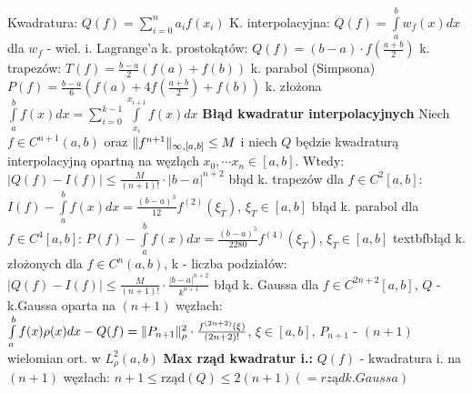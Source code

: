 
\entry
Kwadratura:
	\(
		Q(f) = \sum\limits_{i=0}^n a_if(x_i)
    \)
\entry
K. interpolacyjna:
    \(
        Q(f) = \int\limits_a^bw_f(x)dx
	\) dla $w_f$ - wiel. i. Lagrange'a
\entry
k. prostokątów:
	\(
		Q(f) = (b-a)\cdot f(\frac{a+b}{2})
	\)
\entry
k. trapezów:
	\(
		T(f) = \frac{b-a}{2}(f(a)+f(b))
	\)
\entry
k. parabol (Simpsona)
	\(
		P(f) = \frac{b-a}{6}(f(a) + 4f(\frac{a+b}{2})+f(b))
	\)
\entry
k. złożona
    \(
        \int\limits_a^b f(x)dx = \sum_{i=0}^{k-1} \int\limits_{x_i}^{x_{i+1}} f(x)dx
    \)
\entry
\textbf{Błąd kwadratur interpolacyjnych}
	Niech $f \in C^{n+1}(a, b)$ oraz $\|f^{n+1}\|_{\infty, [a, b]} \leq M$ i niech $Q$ będzie kwadraturą interpolacyjną opartną na węzłąch $x_0, \cdots x_n \in [a, b]$. Wtedy:
	\(
		|Q(f) - I(f)| \leq \frac{M}{(n+1)!} \cdot |b-a|^{n+2}
	\)
\entry
błąd k. trapezów dla $f \in C^2[a, b]$:
	\(
		I(f) - \int\limits_a^bf(x)dx = \frac{(b-a)^3}{12}f^{(2)}(\xi_T)
	\), $\xi_T \in [a, b]$
\entry
błąd k. parabol dla $f \in C^4[a, b]$:
	\(
		P(f) - \int\limits_a^bf(x)dx = \frac{(b-a)^5}{2280}f^{(4)}(\xi_T)
	\), $\xi_T \in [a, b]$
\entry
textbf{błąd k. złożonych} dla $f \in C^{n}(a, b)$, k - liczba podziałów:
    \(
        |Q(f) - I(f)| \leq \frac{M}{(n+1)!} \cdot \frac{|b-a|^{n+2}}{k^{n+1}}
    \)
\entry
błąd k. Gaussa dla $f \in  C^{2n+2}[a, b]$, $Q$ - k.Gaussa oparta na $(n+1)$ węzłach:
	\(
		\int\limits_a^b f(x)\rho(x)dx - Q(f) = \|P_{n+1}\|^2_\rho\cdot \frac{f^{(2n+2)}(\xi)}{(2n+2)!}
	\), $\xi \in [a, b]$, $P_{n+1}$ - $(n+1)$ wielomian ort. w $L^2_\rho(a, b)$
\entry
\textbf{Max rząd kwadratur i.:} $Q(f)$ - kwadratura i. na $(n+1)$ węzłach:
\(
	n+1 \leq \textrm{rząd}(Q) \leq 2(n+1) (=rząd k. Gaussa)
\)

